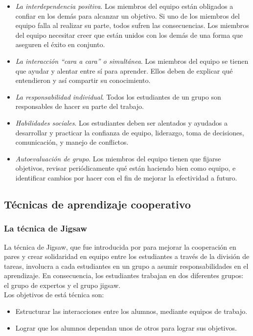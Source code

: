 \begin{itemize}
  \item \emph{La interdependencia positiva}. Los miembros del equipo están obligados a confiar en los demás para alcanzar un objetivo. Si uno de los miembros del equipo falla al realizar su parte, todos sufren las consecuencias. Los miembros del equipo necesitar creer que están unidos con los demás de una forma que aseguren el éxito en conjunto.
  \item \emph{La interacción ``cara a cara'' o simultánea}. Los miembros del equipo se tienen que ayudar y alentar entre sí para aprender. Ellos deben de explicar qué entendieron y así compartir su conocimiento.
  \item \emph{La responsabilidad individual}. Todos los estudiantes de un grupo son responsables de hacer su parte del trabajo.
  \item \emph{Habilidades sociales}. Los estudiantes deben ser alentados y ayudados a desarrollar y practicar la confianza de equipo, liderazgo, toma de decisiones, comunicación, y manejo de conflictos.
  \item \emph{Autoevaluación de grupo}. Los miembros del equipo tienen que fijarse objetivos, revisar periódicamente qué están haciendo bien como equipo, e identificar cambios por hacer con el fin de mejorar la efectividad a futuro.
\end{itemize}
\subsection{Técnicas de aprendizaje cooperativo}

\subsubsection{La técnica de Jigsaw}

La técnica de Jigsaw, que fue introducida por \cite{aronson_jigsaw_1978} para mejorar la cooperación en pares y crear solidaridad en equipo entre los estudiantes a través de la división de tareas, involucra a cada estudiantes en un grupo a asumir responsabilidades en el aprendizaje. En consecuencia, los estudiantes trabajan en dos diferentes grupos: el grupo de expertos y el grupo jigsaw.\\

Los objetivos de está técnica son:

\begin{itemize}
  \item Estructurar las interacciones entre los alumnos, mediante equipos de trabajo.
  \item Lograr que los alumnos dependan unos de otros para lograr sus objetivos.
\end{itemize}

